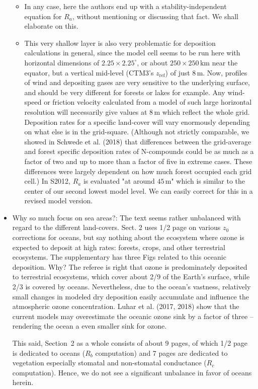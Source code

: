 \documentclass{scrartcl}
\begin{document}
\begin{itemize}
\begin{itemize}
\item {\color{blue} In any case, here
the authors end up with a stability-independent equation for $R_a$, without mentioning or
discussing that fact.}
  We shall elaborate on this.
\item {\color{blue} This very shallow layer is also very problematic for deposition calculations in general,
since the model cell seems to be run here with horizontal dimensions of $2.25 \times 2.25^\circ$,
or about $250 \times 250\,\mathrm{km}$ near the equator, but a vertical mid-level (CTM3’s $z_\mathrm{ref}$) of
just 8\,m. Now, profiles of wind and depositing gases are very sensitive to the underlying
surface, and should be very different for forests or lakes for example. Any wind-speed
or friction velocity calculated from a model of such large horizontal resolution will necessarily give values
at 8\,m which reflect the whole grid. Deposition rates for a specific
land-cover will vary enormously depending on what else is in the grid-square. (Although not strictly comparable,
we showed in Schwede et al. (2018) that differences
between the grid-average and forest specific deposition rates of N-compounds could be
as much as a factor of two and up to more than a factor of five in extreme cases. These
differences were largely dependent on how much forest occupied each grid cell.)}
  In S2012, $R_a$ is evaluated "at around $45\,\mathrm{m}$" which is similar to the center of our second lowest model level. We can easily correct for this in a revised model version. 
\end{itemize}      
\item {\color{blue} Why so much focus on sea areas?: The text seems rather unbalanced with regard to the different land-covers. Sect. 2 uses 1/2 page on various $z_0$ corrections for oceans, but say nothing about the ecosystem
where ozone is expected to deposit at high rates: forests, crops, and other terrestrial
ecosystems. The supplementary has three Figs related to this oceanic deposition. Why?}
  The referee is right that ozone is predominately deposited to terrestrial ecosystems, which cover about 2/9 of the Earth's surface, while 2/3 is covered by oceans. Nevertheless, due to the ocean's vastness, relatively small changes in modeled dry deposition easily accumulate and influence the atmospheric ozone concentration. Luhar et al. (2017, 2018) show that the current models may overestimate the oceanic ozone sink by a factor of three -- rendering the ocean a even smaller sink for ozone.
  
  This said, Section~2 as a whole consists of about 9 pages, of which 1/2 page is dedicated to oceans ($R_b$ computation) and 7 pages are dedicated to vegetation especially stomatal and non-stomatal conductance ($R_c$ computation). Hence, we do not see a significant unbalance in favor of oceans herein.


\end{itemize}
\end{document}
